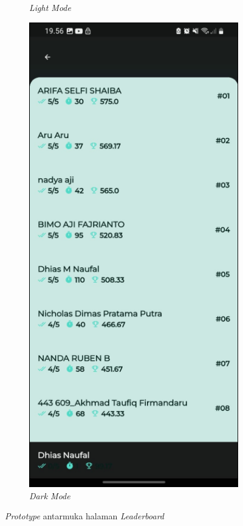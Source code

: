 \begin{figure}[H]
\begin{subfigure}[b]{0.26\textwidth}
	  \caption{\textit{Light Mode}}
	  \label{fig:HasilQuizLeader}
	\end{subfigure}
	\begin{subfigure}[b]{0.26\textwidth}
		\centering
	  \includegraphics[width=\linewidth]{contents/chapter-3/images/HF-Leaderboard-dt.png}
	  \caption{\textit{Dark Mode}}
	  \label{fig:HasilQuizLeader2}
	\end{subfigure}
	\caption{\textit{Prototype} antarmuka halaman \textit{Leaderboard}}
	\label{Fig:HasilFeatureSetLeaderboard}
\end{figure}
